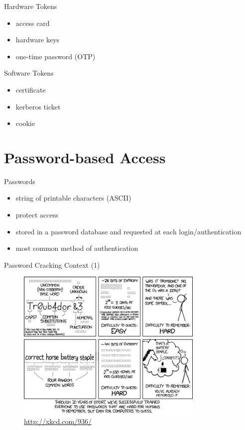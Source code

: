 \documentclass{curs}
\begin{document}
\begin{frame}{Hardware Tokens}
  \begin{itemize}
      \item access card
      \item hardware keys
      \item one-time password (OTP)
    \end{itemize}
\end{frame}

\begin{frame}{Software Tokens}
  \begin{itemize}
    \item certificate
    \item kerberos ticket
    \item cookie
  \end{itemize}
\end{frame}


\section {Password-based Access}

\begin{frame}{Passwords}
  \begin{itemize}
    \item string of printable characters (ASCII)
    \item protect access
    \item stored in a password database and requested at each
      login/authentication
    \item most common method of authentication
  \end{itemize}
\end{frame}

\begin{frame}{Password Cracking Context (1)}
  \begin{figure}
    \centering
    \includegraphics[width=0.8\textwidth]{img/password-strength.png} \\
    \tiny{\url{http://xkcd.com/936/}}
  \end{figure}
\end{frame}
\end{document}

